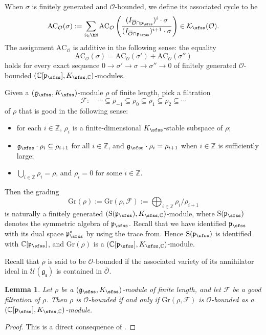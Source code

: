 \documentclass[11pt,a4paper]{amsart}
\newcommand{\CF}{{\mathcal {F}}}
\newcommand{\CK}{{\mathcal {K}}}
\newcommand{\CO}{{\mathcal {O}}}
\newcommand{\CU}{{\mathcal {U}}}
\newcommand{\oS}{\operatorname{S}}
\newcommand{\g}{\mathfrak g}
\newcommand{\p}{\mathfrak p}
\newcommand{\Z}{\mathbb{Z}}
\newcommand{\be}{\begin {equation}}
\newcommand{\ee}{\end {equation}}
\numberwithin{equation}{section}
\newtheorem{lem}[thm]{Lemma}
\theoremstyle{remark}
\def\subset{\subseteq}
\begin{document}
 When $\sigma$ is finitely generated and $\CO$-bounded, we define its associated cycle to be
\[
  \mathrm{AC}_\CO(\sigma):=\sum_{i\in \bN}\mathrm{AC}_\CO\left(\frac{(I_{\overline \CO\cap \p_\sfss})^i\cdot \sigma}{(I_{\overline \CO\cap \p_\sfss})^{i+1}\cdot \sigma}\right)\in  \CK_\sfss(\CO).
\]
The assignment $\mathrm{AC}_\CO$ is additive in the following sense: the equality
\[
 \mathrm{AC}_\CO(\sigma)= \mathrm{AC}_\CO(\sigma')+ \mathrm{AC}_\CO(\sigma'')
\]
holds for every exact sequence
$0\rightarrow \sigma'\rightarrow \sigma\rightarrow \sigma''\rightarrow 0$ of finitely generated $\CO$-bounded $(\C[\p_{\sfss}], K_{\sfss, \C})$-modules.


Given a $(\g_\sfss, K_{\sfss})$-module $\rho$ of finite length, pick a filtration
\be\label{goodf}
\CF:\quad  \cdots\subset \rho_{-1}\subset \rho_0\subset \rho_1\subset \rho_2\subset \cdots
\ee
of $\rho$ that is good in the following sense:
\begin{itemize}
\item for each $i\in \Z$, $\rho_i$ is a finite-dimensional  $K_{\sfss}$-stable subspace of $\rho$;
\item $\g_\sfss \cdot \rho_i\subset \rho_{i+1}$ for all $i\in \Z$, and $\g_\sfss \cdot \rho_i=\rho_{i+1}$ when  $i\in \Z$ is sufficiently large;
\item $\bigcup_{i\in \Z} \rho_i=\rho$, and $\rho_i=0$ for some $i\in \Z$.
\end{itemize}
Then the grading
\[
  \mathrm{Gr}(\rho):= \mathrm{Gr}(\rho,\CF):=\bigoplus_{i\in \Z} \rho_i/\rho_{i+1}
\]
is naturally a finitely generated  $(\oS(\p_{\sfss}), K_{\sfss, \C})$-module, where $\oS(\p_{\sfss})$ denotes the symmetric algebra of $\p_\sfss$. Recall that we have identified $\p_\sfss$ with its dual space $\p_\sfss^*$ by using the trace from. Hence $\oS(\p_{\sfss})$ is identified with $\C[\p_\sfss]$, and $\mathrm{Gr}(\rho)$ is a $(\C[\p_{\sfss}], K_{\sfss, \C})$-module.


Recall that $\rho$ is said to be $\CO$-bounded if the associated variety of its annihilator ideal in $\CU(\g_\mathsf s)$ is contained in  $\overline \CO$.

\begin{lem}\label{l62}
Let $\rho$ be a $(\g_\sfss, K_{\sfss})$-module  of finite length,  and let $\CF$ be a  good filtration of $\rho$. Then $\rho$ is $\CO$-bounded if and only if $\mathrm{Gr}(\rho, \CF)$ is $\CO$-bounded as a $(\C[\p_{\sfss}], K_{\sfss, \C})$-module.
\end{lem}
\begin{proof}
This is a direct consequence of   \cite[Theorem 8.4]{Vo89}.
\end{proof}
\end{document}
